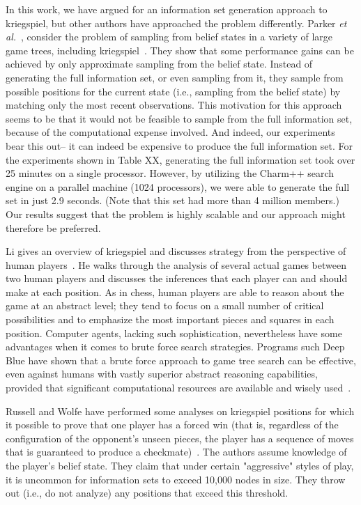 \documentclass[11pt]{article}
\newcommand{\etal}{{\em et al.}\ }
\begin{document}
In this work, we have argued for an information set generation approach to kriegspiel, but other authors have approached
the problem differently.  Parker \etal, consider the problem of sampling from belief states in a variety of large
game trees, including kriegspiel~\cite{parker05game}.  They show that some performance gains can be achieved by only
approximate sampling from the belief state.  Instead of generating the full information set, or even sampling from it,
they sample from possible positions for the current state (i.e., sampling from the belief state) by matching only the
most recent observations.  This motivation for this approach seems to be that it would not be feasible to sample from
the full information set, because of the computational expense involved.  And indeed, our experiments bear this out-- it
can indeed be expensive to produce the full information set.  For the experiments shown in Table XX, generating the full
information set took over 25 minutes on a single processor.  However, by utilizing the Charm++ search engine on a
parallel machine (1024 processors), we were able to generate the full set in just 2.9 seconds.  (Note that this set had
more than 4 million members.)  Our results suggest that the problem is highly scalable and our approach might therefore
be preferred.

Li gives an overview of kriegspiel and discusses strategy from the perspective of human players~\cite{li94chess}.  He
walks through the analysis of several actual games between two human players and discusses the inferences that each
player can and should make at each position.  As in chess, human players are able to reason about the game at an
abstract level; they tend to focus on a small number of critical possibilities and to emphasize the most important
pieces and squares in each position.  Computer agents, lacking such sophistication, nevertheless have some advantages
when it comes to brute force search strategies. Programs such Deep Blue have shown that a brute force approach to game
tree search can be effective, even against humans with vastly superior abstract reasoning capabilities, provided that
significant computational resources are available and wisely used~\cite{campbell02deep}.

Russell and Wolfe have performed some analyses on kriegspiel positions for which it possible to prove that one player
has a forced win (that is, regardless of the configuration of the opponent's unseen pieces, the player has a sequence of
moves that is guaranteed to produce a checkmate)~\cite{russell05efficient, wolfe07exploiting}.  The authors assume
knowledge of the player's belief state.  They claim that under certain "aggressive" styles of play, it is uncommon for
information sets to exceed 10,000 nodes in size.  They throw out (i.e., do not analyze) any positions that exceed this
threshold.  
\end{document}
